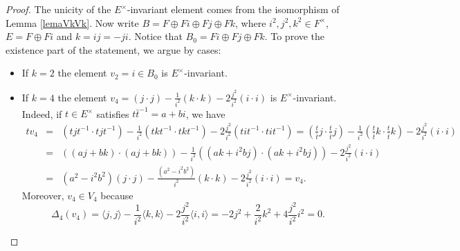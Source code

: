 \documentclass{amsart}
\theoremstyle{definition}
\theoremstyle{remark}
\numberwithin{equation}{section}
\begin{document}
\begin{proof}
The unicity of the $E^\times$-invariant element comes from the isomorphism of Lemma \ref{lemaVkVk}. Now write $B=F\oplus Fi \oplus Fj\oplus Fk$, where $i^2,j^2,k^2\in F^\times$, $E=F\oplus Fi$ and $k=ij=-ji$. Notice that $B_0= Fi \oplus Fj\oplus Fk$. To prove the existence part of the statement, we argue by cases:
\begin{itemize}
\item    If $k=2$ the element $v_2=i\in B_0$ is $E^\times$-invariant.

\item If $k=4$ the element $v_4=(j\cdot j)-\frac{1}{i^2}(k\cdot k)-2\frac{j^2}{i^2}(i\cdot i)$ is $E^\times$-invariant. Indeed, if $t\in E^\times$ satisfies $t\bar t^{-1}=a+bi$, we have 
\begin{eqnarray*}
    t v_4&=&(tjt^{-1}\cdot tjt^{-1})-\frac{1}{i^2}(t kt^{-1}\cdot tkt^{-1})-2\frac{j^2}{i^2}(tit^{-1}\cdot tit^{-1})=\left(\frac{t}{\bar t}j\cdot \frac{t}{\bar t}j\right)-\frac{1}{i^2}\left(\frac{t}{\bar t} k\cdot \frac{t}{\bar t}k\right)-2\frac{j^2}{i^2}(i\cdot i)\\
    &=&\left((aj+bk)\cdot (aj+bk)\right)-\frac{1}{i^2}\left((ak+i^2bj)\cdot (ak+i^2bj)\right)-2\frac{j^2}{i^2}(i\cdot i)\\
    &=&(a^2-i^2b^2)(j\cdot j)-\frac{(a^2-i^2b^2)}{i^2}(k\cdot k)-2\frac{j^2}{i^2}(i\cdot i)=v_4.
\end{eqnarray*}
Moreover, $v_4\in V_4$ because
\[
\Delta_4(v_4)=\langle j,j\rangle- \frac{1}{i^2}\langle k,k\rangle-2\frac{j^2}{i^2}\langle i,i\rangle=-2j^2+ \frac{2}{i^2}k^2+4\frac{j^2}{i^2}i^2=0.
\]


\end{itemize}
\end{proof}
\end{document}
